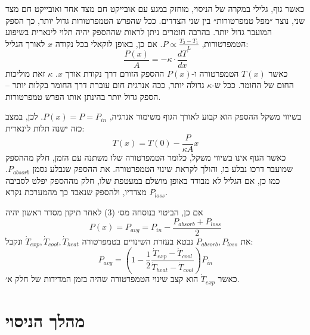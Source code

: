 \documentclass[10pt,a4paper]{article}
\begin{document}
כאשר גוף, גלילי במקרה של הניסוי, מוחזק במגע עם אובייקט חם מצד אחד ואובייקט חם מצד שני, נוצר ״מפל טמפרטורות״ בין שני הצדדים. ככל שהפרש הטמפרטורות גדול יותר, כך הספק המועבר גדול יותר. בהרבה חומרים ניתן לראות שההספק יהיה תלוי לינארית בשיפוע הטמפרטורות, $P \propto \frac{T_2 - T_1}{L}$. אם כן, באופן לוקאלי בכל נקודה $x$ לאורך הגליל:
\begin{equation}\label{eq:fourier}
\frac{P(x)}{A} = -\kappa \cdot \frac{dT}{dx}
\end{equation}
כאשר $T(x)$ הטמפרטורה ו-$P(x)$ ההספק הזורם דרך נקודת אורך $x$. $\kappa$ זאת מוליכות החום של החומר. ככל ש-$\kappa$ גדולה יותר, ככה אנרגית חום עוברת דרך החומר בקלות יותר -- הספק גדול יותר בהינתן אותו הפרש טמפרטורות.

בשיווי משקל ההספק הוא קבוע לאורך הגוף משימור אנרגיה, $P(x) = P = P_{in}$. לכן, במצב כזה ישנה תלות לינארית:
\begin{equation}\label{eq:linear}
T(x) = T(0) - \frac{P}{\kappa A} x
\end{equation}
כאשר הגוף אינו בשיווי משקל, כלומר הטמפרטורה שלו משתנה עם הזמן, חלק מההספק שמועבר דרכו נבלע בו, והולך לקראת שינוי הטמפרטורה. את ההספק שנבלע נסמן $P_{absorb}$. כמו כן, אם הגליל לא מבודד באופן מושלם במעטפת שלו, חלק מההספק יפלט לסביבה מצדדיו, ולהספק שנאבד כך מהמערכת נקרא $P_{loss}$.

אם כן, הביטוי בנוסחה מס׳ (3) לאחר תיקון מסדר ראשון יהיה
\[
P(x) = P_{avg} = P_{in} - \frac{P_{absorb} + P_{loss}}{2}
\]
את $P_{absorb}, P_{loss}$ נבטא בעזרת השינויים בטמפרטורה $\dot{T}_{exp}, \dot{T}_{cool}, \dot{T}_{heat}$ ונקבל:
\begin{equation}\label{eq:pavg}
P_{avg} = \left(1 - \frac{1}{2} \frac{\dot{T}_{exp} - \dot{T}_{cool}}{\dot{T}_{heat} - \dot{T}_{cool}}\right) P_{in}
\end{equation}
כאשר $\dot{T}_{exp}$ הוא קצב שינוי הטמפרטורה שהיה בזמן המדידות של חלק א׳.

\section*{מהלך הניסוי}
\end{document}
